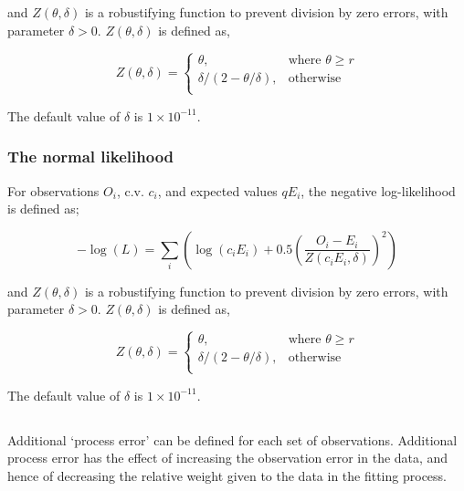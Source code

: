 {{{{{{and $Z \left(\theta,\delta \right)$ is a robustifying function to prevent division by zero errors, with parameter $\delta>0$. $Z \left(\theta,\delta \right)$ is defined as,

\begin{equation}
   Z \left(\theta,\delta \right) = \begin{cases}
	  \theta, & \text{where $\theta \ge r$} \\
	  \delta/\left( 2-\theta/\delta \right), & \text{otherwise} \\  
  \end{cases}
\end{equation}

The default value of $\delta$ is $1 \times 10^{-11}$.

\subsubsection*{The normal likelihood}

For observations $O_i$, c.v. $c_i$, and expected values $qE_i$, the negative log-likelihood is defined as;

\begin{equation}
 - \log \left(L \right) = \sum\limits_i \left( \log \left( c_i E_i \right) +0.5 \left( \frac{O_i-E_i}{Z\left(c_i E_i,\delta \right)}\right)^2\right)
\end{equation}

and $Z \left(\theta,\delta \right)$ is a robustifying function to prevent division by zero errors, with parameter $\delta>0$. $Z \left(\theta,\delta \right)$ is defined as,

\begin{equation}
   Z \left(\theta,\delta \right) = \begin{cases}
	  \theta, & \text{where $\theta \ge r$} \\
	  \delta/\left( 2-\theta/\delta \right), & \text{otherwise} \\  
  \end{cases}
\end{equation}

The default value of $\delta$ is $1 \times 10^{-11}$.

\subsection{}

Additional `process error' can be defined for each set of observations. Additional process error has the effect of increasing the observation error in the data, and hence of decreasing the relative weight given to the data in the fitting process. 

}}}}}}
